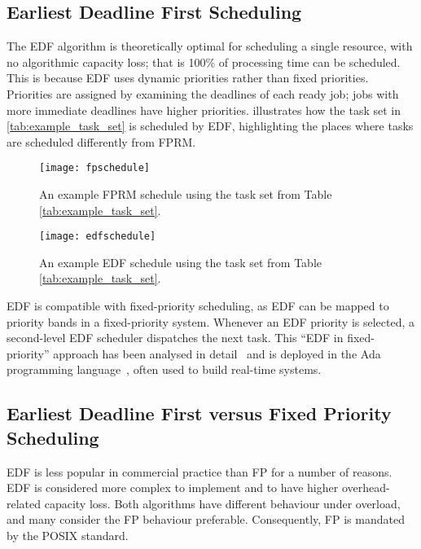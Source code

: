 \subsection{Earliest Deadline First Scheduling}
\label{sec:background-edf}

The \gls{EDF} algorithm is theoretically optimal for scheduling a single resource, with no
algorithmic capacity loss; that is 100\% of processing time can be scheduled. This is because
\gls{EDF} uses dynamic priorities rather than fixed priorities. 
Priorities are assigned by examining the deadlines of each ready job; jobs with more immediate deadlines have higher priorities.
 illustrates how the task set in \cref{tab:example_task_set} is scheduled by
\gls{EDF}, highlighting the places where tasks are scheduled differently from FPRM.

\begin{figure}[t]
	\centering
    \texttt{[image: fpschedule]}
    \caption[An example FPRM schedule.]{An example FPRM schedule using the task set from Table \ref{tab:example_task_set}.}
    \label{f:fp-schedule}
\end{figure}
\begin{figure}[t]
	\centering	
	\texttt{[image: edfschedule]}
    \caption[An example EDF schedule.]{An example EDF schedule using the task set from Table \ref{tab:example_task_set}.}
	\label{f:edf-schedule}
\end{figure}

\gls{EDF} is compatible with fixed-priority scheduling, as \gls{EDF} can be mapped to priority bands
in a fixed-priority system. Whenever an \gls{EDF} priority is selected, a second-level \gls{EDF}
scheduler dispatches the next task. This ``EDF in fixed-priority'' approach has been analysed in
detail~\citep{Harbour_Palencia_03} and is deployed in the Ada programming
language~\citep{Burns_Wellings:crtpa}, often used to build real-time systems.

\subsection{Earliest Deadline First versus Fixed Priority Scheduling}
\label{s:overload}

\gls{EDF} is less popular in commercial practice than \gls{FP} for a number of reasons.  \gls{EDF}
is considered more complex to implement and to have higher overhead-related capacity loss.
Both algorithms have different behaviour under overload, and many consider the \gls{FP} behaviour
preferable.  Consequently, \gls{FP}
is mandated by the POSIX standard.

